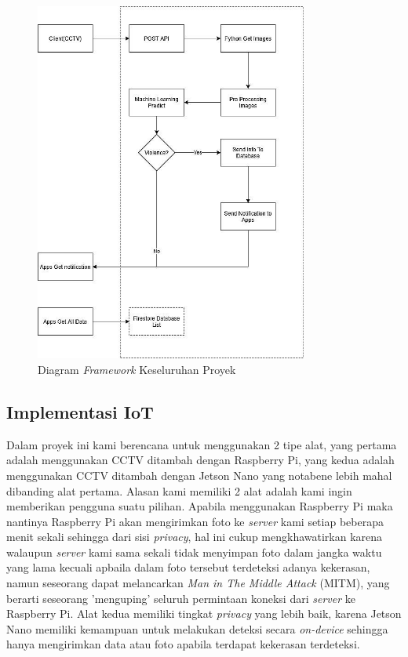 \begin{figure} [!ht]
  \centering
  \includegraphics[width=0.8\textwidth]{gambar/framework.jpg}
  \caption{Diagram \textit{Framework} Keseluruhan Proyek}
  \label{fig:framework}
\end{figure}

\subsection{Implementasi IoT}

Dalam proyek ini kami berencana untuk menggunakan 2 tipe alat, yang pertama adalah menggunakan CCTV ditambah dengan Raspberry Pi, yang kedua adalah menggunakan CCTV ditambah dengan Jetson Nano yang notabene lebih mahal dibanding alat pertama. Alasan kami memiliki 2 alat adalah kami ingin memberikan pengguna suatu pilihan. Apabila menggunakan Raspberry Pi maka nantinya Raspberry Pi akan mengirimkan foto ke \textit{server} kami setiap beberapa menit sekali sehingga dari sisi \textit{privacy}, hal ini cukup mengkhawatirkan karena walaupun \textit{server} kami sama sekali tidak menyimpan foto dalam jangka waktu yang lama kecuali apbaila dalam foto tersebut terdeteksi adanya kekerasan, namun seseorang dapat melancarkan \textit{Man in The Middle Attack} (MITM), yang berarti seseorang 'menguping' seluruh permintaan koneksi dari \textit{server} ke Raspberry Pi. Alat kedua memiliki tingkat \textit{privacy} yang lebih baik, karena Jetson Nano memiliki kemampuan untuk melakukan deteksi secara \textit{on-device} sehingga hanya mengirimkan data atau foto apabila terdapat kekerasan terdeteksi.